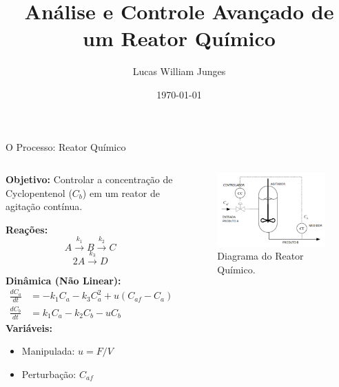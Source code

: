\documentclass{beamer}
\title{Análise e Controle Avançado de um Reator Químico}
\author{Lucas William Junges}
\institute{Universidade Federal de Santa Catarina (UFSC)}
\date{\today}
\begin{document}
\begin{frame}
    \titlepage
\end{frame}

\begin{frame}{O Processo: Reator Químico}
    \begin{columns}[T]
        \begin{column}{0.5\textwidth}
            \textbf{Objetivo:} Controlar a concentração de Cyclopentenol (\(C_b\)) em um reator de agitação contínua.
            \vspace{1em}
            
            \textbf{Reações:}
            \[ A \xrightarrow{k_1} B \xrightarrow{k_2} C \]
            \[ 2A \xrightarrow{k_3} D\]
            
            \textbf{Dinâmica (Não Linear):}
            {\tiny
            \begin{align*}
            \frac{dC_a}{dt} &= -k_1 C_a - k_3 C_a^2 + u(C_{af} - C_a) \\
            \frac{dC_b}{dt} &= k_1 C_a - k_2 C_b - u C_b
            \end{align*}
            }
            \vspace{1em}
            \textbf{Variáveis:}
            \begin{itemize}
                \item Manipulada: \(u = F/V\)
                \item Perturbação: \(C_{af}\)
            \end{itemize}
        \end{column}
        \begin{column}{0.5\textwidth}
            \begin{figure}
                \includegraphics[width=\textwidth]{Imagens/Reator.png}
                \caption{Diagrama do Reator Químico.}
            \end{figure}
        \end{column}
    \end{columns}
\end{frame}
\end{document}
